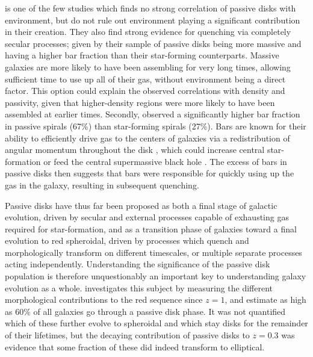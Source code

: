 \citet{Masters2010} is one of the few studies which finds no strong correlation of passive disks with environment, but do not rule out environment playing a significant contribution in their creation. They also find strong evidence for quenching via completely secular processes; given by their sample of passive disks being more massive and having a higher bar fraction than their star-forming counterparts. Massive galaxies are more likely to have been assembling for very long times, allowing sufficient time to use up all of their gas, without environment being a direct factor. This option could explain the observed correlations with density and passivity, given that higher-density regions were more likely to have been assembled at earlier times. Secondly, \citet{Masters2010} observed a significantly higher bar fraction in passive spirals (67\%) than star-forming spirals (27\%). Bars are known for their ability to efficiently drive gas to the centers of galaxies via a redistribution of angular momentum throughout the disk \citep{Sellwood1993,Shlosman1989,Ann2005}, which could increase central star-formation \citep{Hawarden1986,Ho1997} or feed the central supermassive black hole \citep{Athanassoula1992,Friedli1993}. The excess of bars in passive disks then suggests that bars were responsible for quickly using up the gas in the galaxy, resulting in subsequent quenching. 

Passive disks have thus far been proposed as both a final stage of galactic evolution, driven by secular and external processes capable of exhausting gas required for star-formation, and as a transition phase of galaxies toward a final evolution to red spheroidal, driven by processes which quench and morphologically transform on different timescales, or multiple separate processes acting independently. Understanding the significance of the passive disk population is therefore unquestionably an important key to understanding galaxy evolution as a whole. \citet{Bundy2010} investigates this subject by measuring the different morphological contributions to the red sequence since $z=1$, and estimate as high as 60\% of all galaxies go through a passive disk phase. It was not quantified which of these further evolve to spheroidal and which stay disks for the remainder of their lifetimes, but the decaying contribution of passive disks to $z=0.3$ was evidence that some fraction of these did indeed transform to elliptical.

